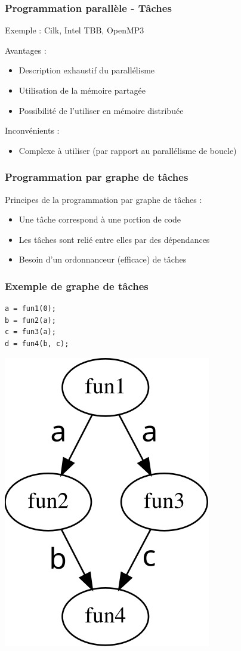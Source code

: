 \documentclass{beamer}
\begin{document}
\begin{frame}
  \frametitle{Programmation parallèle - Tâches}
  Exemple : Cilk, Intel TBB, OpenMP3
  \bigskip

  Avantages :
  \begin{itemize}
    \item Description exhaustif du parallélisme
    \item Utilisation de la mémoire partagée
    \item Possibilité de l'utiliser en mémoire distribuée
  \end{itemize}

  Inconvénients :
  \begin{itemize}
    \item Complexe à utiliser (par rapport au parallélisme de boucle)
  \end{itemize}
\end{frame}


\begin{frame}
  \frametitle{Programmation par graphe de tâches}

  Principes de la programmation par graphe de tâches :
  \begin{itemize}
    \item Une tâche correspond à une portion de code
    \item Les tâches sont relié entre elles par des dépendances
    \item Besoin d'un ordonnanceur (efficace) de tâches
  \end{itemize}
\end{frame}


\begin{frame}[fragile]
  \frametitle{Exemple de graphe de tâches}


\begin{lstlisting}
a = fun1(0);
b = fun2(a);
c = fun3(a);
d = fun4(b, c);
\end{lstlisting}

  \centerline{\includegraphics[width=0.25\linewidth]{agg_exemple}}
\end{frame}
\end{document}
